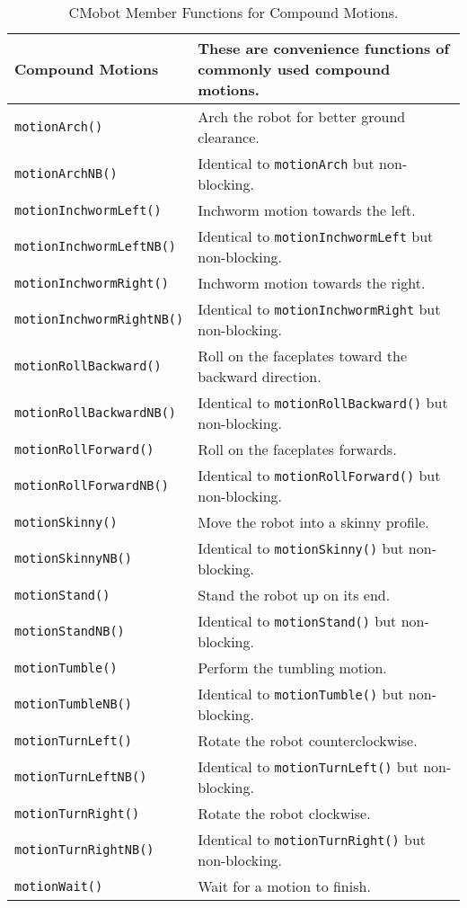 \begin{table}[!h]
\begin{center}
\caption{CMobot Member Functions for Compound Motions.}
\begin{tabular}{p{38 mm}p{107 mm}}
Compound Motions & These are convenience functions of commonly used compound motions. \\
\hline
\texttt{motionArch()} \dotfill & Arch the robot for better ground clearance. \\
\texttt{motionArchNB()} \dotfill & Identical to \texttt{motionArch} but non-blocking. \\
\texttt{motionInchwormLeft()} \dotfill & Inchworm motion towards the left. \\
\texttt{motionInchwormLeftNB()} \dotfill & Identical to \texttt{motionInchwormLeft} but non-blocking. \\
\texttt{motionInchwormRight()} \dotfill & Inchworm motion towards the right. \\
\texttt{motionInchwormRightNB()} \dotfill & Identical to \texttt{motionInchwormRight} but non-blocking. \\
\texttt{motionRollBackward()} \dotfill & Roll on the faceplates toward the backward direction. \\
\texttt{motionRollBackwardNB()} \dotfill & Identical to \texttt{motionRollBackward()} but non-blocking. \\
\texttt{motionRollForward()} \dotfill & Roll on the faceplates forwards. \\
\texttt{motionRollForwardNB()} \dotfill & Identical to \texttt{motionRollForward()} but non-blocking. \\
\texttt{motionSkinny()} \dotfill & Move the robot into a skinny profile. \\
\texttt{motionSkinnyNB()} \dotfill & Identical to \texttt{motionSkinny()} but non-blocking. \\
\texttt{motionStand()} \dotfill & Stand the robot up on its end. \\
\texttt{motionStandNB()} \dotfill & Identical to \texttt{motionStand()} but non-blocking. \\
\texttt{motionTumble()} \dotfill & Perform the tumbling motion. \\
\texttt{motionTumbleNB()} \dotfill & Identical to \texttt{motionTumble()} but non-blocking. \\
\texttt{motionTurnLeft()} \dotfill & Rotate the robot counterclockwise. \\
\texttt{motionTurnLeftNB()} \dotfill & Identical to \texttt{motionTurnLeft()} but non-blocking. \\
\texttt{motionTurnRight()} \dotfill & Rotate the robot clockwise. \\
\texttt{motionTurnRightNB()} \dotfill & Identical to \texttt{motionTurnRight()} but non-blocking. \\
\texttt{motionWait()} \dotfill & Wait for a motion to finish. \\
\hline
\end{tabular}
\end{center}
\label{mobilec_api_compound}
\end{table}

